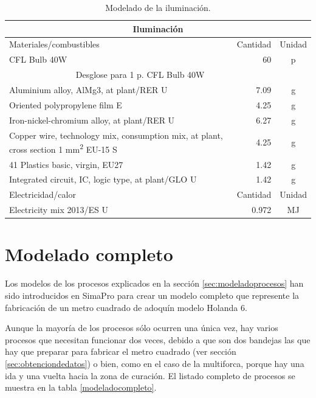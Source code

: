 \begin{table}[!htb]
\centering
\begin{tabular}{p{8cm}rc}
\toprule
\multicolumn{3}{c}{Iluminación}\\
\midrule
Materiales/combustibles & Cantidad & Unidad\\
\midrule
CFL Bulb 40W & 60 & p\\
\multicolumn{2}{c}{Desglose para 1 p. CFL Bulb 40W}\\
\cmidrule(r){1-2}
Aluminium alloy, AlMg3, at plant/RER U & 7.09 & \si{g}\\
Oriented polypropylene film E & 4.25 & \si{g}\\
Iron-nickel-chromium alloy, at plant/RER U & 6.27 & \si{g}\\
Copper wire, technology mix, consumption mix, at plant, cross section 1 \si{mm^2} EU-15 S & 4.25 & \si{g}\\
41 Plastics basic, virgin, EU27 & 1.42 & \si{g}\\
Integrated circuit, IC, logic type, at plant/GLO U & 1.42 & \si{g}\\
\midrule
Electricidad/calor & Cantidad & Unidad\\
\midrule
Electricity mix 2013/ES U & 0.972 & \si{MJ}\\
\bottomrule
\end{tabular}
\caption{Modelado de la iluminación.}
\label{modeladodeiluminacion}
\end{table}

\section{Modelado completo}

Los modelos de los procesos explicados en la sección \ref{sec:modeladoprocesos} han sido introducidos en SimaPro para crear un modelo completo que represente la fabricación de un metro cuadrado de adoquín modelo Holanda 6.

Aunque la mayoría de los procesos sólo ocurren una única vez, hay varios procesos que necesitan funcionar dos veces, debido a que son dos bandejas las que hay que preparar para fabricar el metro cuadrado (ver sección \ref{sec:obtenciondedatos}) o bien, como en el caso de la multiforca, porque hay una ida y una vuelta hacia la zona de curación. El listado completo de procesos se muestra en la tabla \ref{modeladocompleto}.

